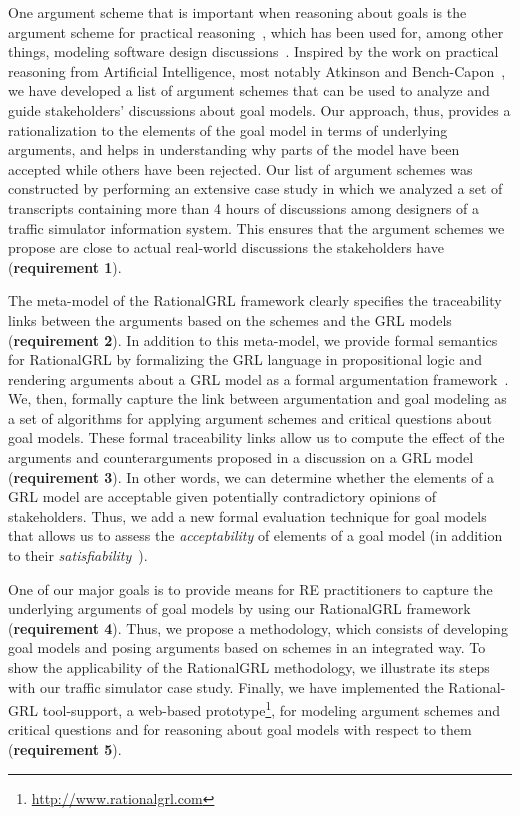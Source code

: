 One argument scheme that is important when reasoning about goals is the argument scheme for practical reasoning~\cite{walton1990,atkinson2007}, which has been used for, among other things, modeling software design discussions~\cite{BlackEtal2013}. Inspired by the work on practical reasoning from Artificial Intelligence, most notably Atkinson and Bench-Capon~\cite{atkinson2007}, we have developed a list of argument schemes that can be used to analyze and guide stakeholders' discussions about goal models. Our approach, thus, provides a rationalization to the elements of the goal model in terms of underlying arguments, and helps in understanding why parts of the model have been accepted while others have been rejected. Our list of argument schemes was constructed by performing an extensive case study in which we analyzed a set of transcripts containing more than 4 hours of discussions among designers of a traffic simulator information system. This ensures that the argument schemes we propose are close to actual real-world discussions the stakeholders have (\textbf{requirement 1}).  

The meta-model of the RationalGRL framework clearly specifies the traceability links between the arguments based on the schemes and the GRL models (\textbf{requirement 2}). In addition to this meta-model, we provide formal semantics for RationalGRL by formalizing the GRL language in propositional logic and rendering arguments about a GRL model as a formal argumentation framework~\cite{Dung1995}. We, then, formally capture the link between argumentation and goal modeling as a set of algorithms for applying argument schemes and critical questions about goal models. These formal traceability links allow us to compute the effect of the arguments and counterarguments proposed in a discussion on a GRL model (\textbf{requirement 3}). In other words, we can determine whether the elements of a GRL model are acceptable given potentially contradictory opinions of stakeholders. Thus, we add a new formal evaluation technique for goal models that allows us to assess the \emph{acceptability} of elements of a goal model (in addition to their \emph{satisfiability}~\cite{Amyot:2010:EGM:1841349.1841356}).

One of our major goals is to provide means for RE practitioners to capture the underlying arguments of goal models by using our RationalGRL framework (\textbf{requirement 4}). Thus, we propose a methodology, which consists of developing goal models and posing arguments based on schemes in an integrated way. To show the applicability of the RationalGRL methodology, we illustrate its steps with our traffic simulator case study. Finally, we have implemented the Rational-GRL tool-support, a web-based prototype\footnote{\url{http://www.rationalgrl.com}}, for modeling argument schemes and critical questions and for reasoning about goal models with respect to them (\textbf{requirement 5}). 

